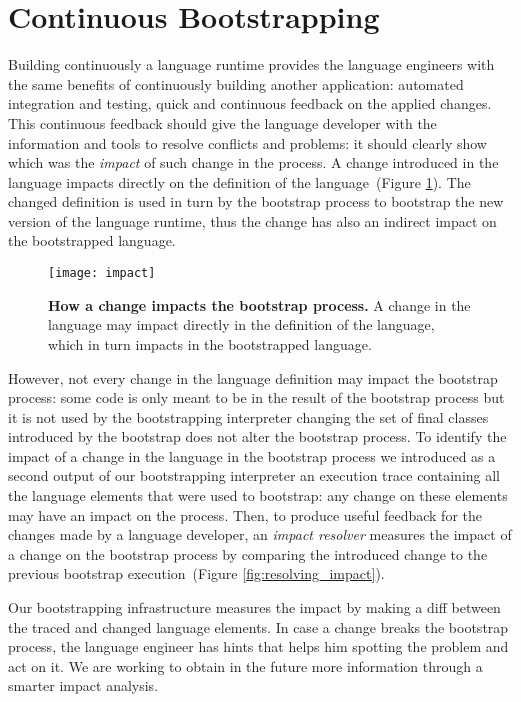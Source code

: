 \section{Continuous Bootstrapping}\label{sec:continuous_bootstrapping}

Building continuously a language runtime provides the language engineers with the same benefits of continuously building another application: automated integration and testing, quick and continuous feedback on the applied changes. This continuous feedback should give the language developer with the information and tools to resolve conflicts and problems: it should clearly show which was the \emph{impact} of such change in the process. A change introduced in the language impacts directly on the definition of the language~(Figure \ref{fig:impact}). The changed definition is used in turn by the bootstrap process to bootstrap the new version of the language runtime, thus the change has also an indirect impact on the bootstrapped language. 

\begin{figure}[ht]
\center
\texttt{[image: impact]}
\caption{\textbf{How a change impacts the bootstrap process.} A change in the language may impact directly in the definition of the language, which in turn impacts in the bootstrapped language.\label{fig:impact}}
\end{figure}

However, not every change in the language definition may impact the bootstrap process: some code is only meant to be in the result of the bootstrap process but it is not used by the bootstrapping interpreter \eg changing the set of final classes introduced by the bootstrap does not alter the bootstrap process. To identify the impact of a change in the language in the bootstrap process we introduced as a second output of our bootstrapping interpreter an execution trace containing all the language elements that were used to bootstrap: any change on these elements may have an impact on the process. Then, to produce useful feedback for the changes made by a language developer, an \emph{impact resolver} measures the impact of a change on the bootstrap process by comparing the introduced change to the previous bootstrap execution~(Figure \ref{fig:resolving_impact}).

Our bootstrapping infrastructure measures the impact by making a diff between the traced and changed language elements. In case a change breaks the bootstrap process, the language engineer has hints that helps him spotting the problem and act on it. We are working to obtain in the future more information through a smarter impact analysis.

